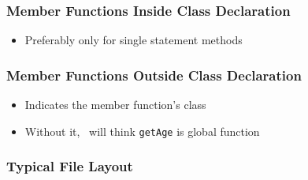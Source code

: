 \begin{frame}
  \frametitle{Member Functions Inside Class Declaration}
  \begin{itemize}
    \item Preferably only for single statement methods
  \end{itemize}
\end{frame}

\begin{frame}
  \frametitle{Member Functions Outside Class Declaration}
  \vskip-5mm
  \begin{itemize}
    \item Indicates the member function's class
    \item Without it, \cpp\ will think \texttt{getAge} is global function
  \end{itemize}
\end{frame}

\begin{frame}
  \frametitle{Typical File Layout}
  \begin{columns}
    \column{5.5cm}
    \column{5.5cm}
  \end{columns}
\end{frame}


